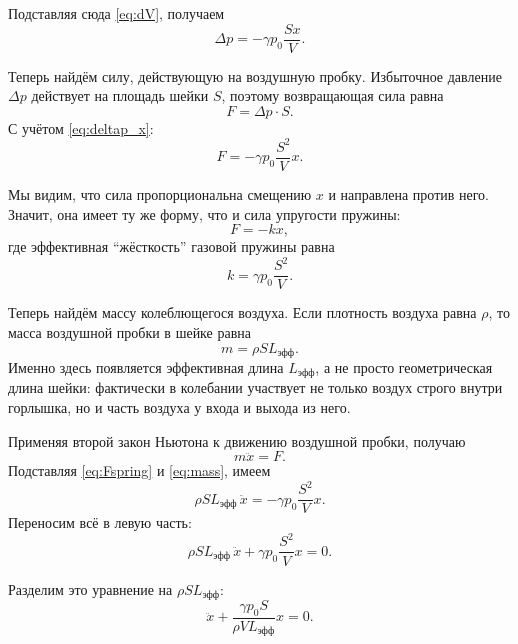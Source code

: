 \documentclass[a4paper,12pt]{article}
\begin{document}
	Подставляя сюда \eqref{eq:dV}, получаем
	\begin{equation}
		\Delta p=-\gamma p_0\frac{Sx}{V}.
		\label{eq:deltap_x}
	\end{equation}
	
	\medskip
	
	Теперь найдём силу, действующую на воздушную пробку. Избыточное давление \(\Delta p\) действует на площадь шейки \(S\), поэтому возвращающая сила равна
	\begin{equation}
		F=\Delta p \cdot S.
	\end{equation}
	С учётом \eqref{eq:deltap_x}:
	\begin{equation}
		F=-\gamma p_0\frac{S^2}{V}x.
		\label{eq:Fspring}
	\end{equation}
	
	Мы видим, что сила пропорциональна смещению \(x\) и направлена против него. Значит, она имеет ту же форму, что и сила упругости пружины:
	\[
	F=-kx,
	\]
	где эффективная ``жёсткость'' газовой пружины равна
	\begin{equation}
		k=\gamma p_0\frac{S^2}{V}.
		\label{eq:k_eff}
	\end{equation}
	
	\medskip
	
	Теперь найдём массу колеблющегося воздуха. Если плотность воздуха равна \(\rho\), то масса воздушной пробки в шейке равна
	\begin{equation}
		m=\rho S L_{\text{эфф}}.
		\label{eq:mass}
	\end{equation}
	Именно здесь появляется эффективная длина \(L_{\text{эфф}}\), а не просто геометрическая длина шейки: фактически в колебании участвует не только воздух строго внутри горлышка, но и часть воздуха у входа и выхода из него.
	
	\medskip
	
	Применяя второй закон Ньютона к движению воздушной пробки, получаю
	\begin{equation}
		m\ddot{x}=F.
	\end{equation}
	Подставляя \eqref{eq:Fspring} и \eqref{eq:mass}, имеем
	\[
	\rho S L_{\text{эфф}}\,\ddot{x}
	=
	-\gamma p_0\frac{S^2}{V}x.
	\]
	Переносим всё в левую часть:
	\begin{equation}
		\rho S L_{\text{эфф}}\,\ddot{x}
		+
		\gamma p_0\frac{S^2}{V}x=0.
		\label{eq:motion1}
	\end{equation}
	
	Разделим это уравнение на \(\rho S L_{\text{эфф}}\):
	\begin{equation}
		\ddot{x}
		+
		\frac{\gamma p_0 S}{\rho V L_{\text{эфф}}}x=0.
		\label{eq:motion2}
	\end{equation}
	
\end{document}
